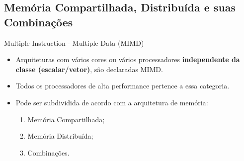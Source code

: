 %
%
%






	\subsection{Memória Compartilhada, Distribuída e suas Combinações}
\begin{frame}{Multiple Instruction - Multiple Data (MIMD)}
	\begin{itemize}
		\item Arquiteturas com vários cores ou vários processadores \textbf{independente da classe (escalar/vetor)}, são declaradas MIMD.
		\item Todos os processadores de alta performance pertence a essa categoria.

				\bigskip

		\item Pode ser subdividida de acordo com a arquitetura de memória:
		\begin{enumerate}
			\item Memória Compartilhada;
			\item Memória Distribuída;
			\item Combinações.
		\end{enumerate}

	\end{itemize}

\end{frame}








